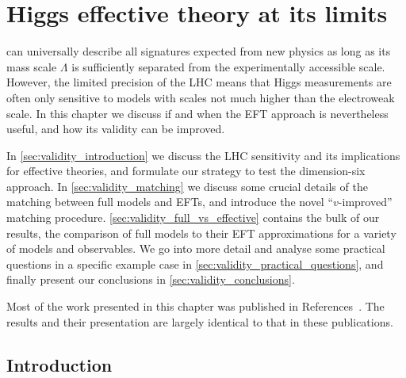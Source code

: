 



\chapter{Higgs effective theory at its limits}
\label{chapter:validity}

 can universally describe all
signatures expected from new physics as long as its mass scale
$\Lambda$ is sufficiently separated from the experimentally accessible
scale. However, the limited precision of the LHC means that Higgs
measurements are often only sensitive to models with scales not much
higher than the electroweak scale. In this chapter we discuss if and
when the EFT approach is nevertheless useful, and how its validity can
be improved.

In \autoref{sec:validity_introduction} we discuss the LHC
sensitivity and its implications for effective theories, and formulate
our strategy to test the dimension-six approach. In
\autoref{sec:validity_matching} we discuss some crucial details of
the matching between full models and EFTs, and introduce the novel
``$v$-improved'' matching
procedure. \autoref{sec:validity_full_vs_effective} contains the
bulk of our results, the comparison of full models to their EFT
approximations for a variety of models and observables. We go into
more detail and analyse some practical questions in a specific example
case in \autoref{sec:validity_practical_questions}, and finally
present our conclusions in \autoref{sec:validity_conclusions}.

Most of the work presented in this chapter was published in
References~\cite{Brehmer:2015rna, Biekotter:2016ecg, deFlorian:2016spz}. 
The results and their presentation are largely identical to
that in these publications.



\section{Introduction}
\label{sec:validity_introduction}

